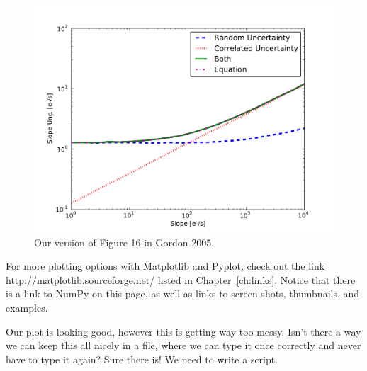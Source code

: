 \begin{figure}[tbp]
  \centering
    \includegraphics[scale=0.6]{splot_log.pdf}
    \caption{Our version of Figure 16 in Gordon 2005.}
  \label{fig:splot}
\end{figure}

For more
plotting options with Matplotlib and Pyplot, check out the link
\url{http://matplotlib.sourceforge.net/} listed in
Chapter~\ref{ch:links}.  Notice that there is a link to NumPy on this
page, as well as links to screen-shots, thumbnails, and examples.

Our plot is looking good, however this is getting way too messy.
Isn't there a way we can keep this all nicely in a file, where we can
type it once correctly and never have to type it again?  Sure there
is!  We need to write a script.
